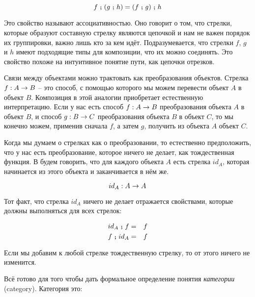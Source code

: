 \[f \footnotesize\textbf{~;~}\normalsize (g \footnotesize\textbf{~;~}\normalsize h) = (f \footnotesize\textbf{~;~}\normalsize g) \footnotesize\textbf{~;~}\normalsize h\]

Это свойство называют ассоциативностью. Оно говорит о том, что стрелки,
которые образуют составную стрелку являются цепочкой и нам не важен
порядок их группировки, важно лишь кто за кем идёт. Подразумевается, что
стрелки $f$, $g$ и $h$ имеют подходящие типы для композиции, что их
можно соединять. Это свойство похоже на интуитивное понятие пути, как
цепочки отрезков.

Связи между объектами можно трактовать как преобразования объектов.
Стрелка $f : A \rightarrow B$ -- это способ, с помощью которого мы можем
перевести объект $A$ в объект $B$. Композиция в этой аналогии
приобретает естественную интерпретацию. Если у нас есть способ
$f : A \rightarrow B$ преобразования объекта $A$ в объект $B$, и способ
$g : B \rightarrow C$ преобразования объекта $B$ в объект $C$, то мы конечно
можем, применив сначала $f$, а затем $g$, получить из объекта $A$ объект
$C$.

Когда мы думаем о стрелках как о преобразовании, то естественно
предположить, что у нас есть преобразование, которое ничего не делает,
как тождественная функция. В будем говорить, что для каждого объекта $A$
есть стрелка $id_A$, которая начинается из этого объекта и заканчивается
в нём же.

\[id_A : A \rightarrow A\]

Тот факт, что стрелка $id_A$ ничего не делает отражается свойствами,
которые должны выполняться для всех стрелок:

\begin{eqnarray*}
id_A \footnotesize\textbf{~;~}\normalsize f &=& f \\
f \footnotesize\textbf{~;~}\normalsize id_A &=& f \\
\end{eqnarray*}

Если мы добавим к любой стрелке тождественную стрелку, то от этого
ничего не изменится.

Всё готово для того чтобы дать формальное определение понятия
 \emph{категории} (category). Категория это:

